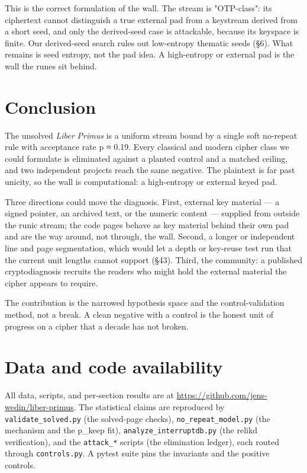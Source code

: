 \documentclass[11pt]{article}
\begin{document}
This is the correct formulation of the wall. The stream is "OTP-class": its ciphertext cannot distinguish a true external pad from a keystream derived from a short seed, and only the derived-seed case is attackable, because its keyspace is finite. Our derived-seed search rules out low-entropy thematic seeds (§6). What remains is seed entropy, not the pad idea. A high-entropy or external pad is the wall the runes sit behind.


\section{Conclusion}

The unsolved \emph{Liber Primus} is a uniform stream bound by a single soft no-repeat rule with acceptance rate p ≈ 0.19. Every classical and modern cipher class we could formulate is eliminated against a planted control and a matched ceiling, and two independent projects reach the same negative. The plaintext is far past unicity, so the wall is computational: a high-entropy or external keyed pad.


Three directions could move the diagnosis. First, external key material — a signed pointer, an archived text, or the numeric content — supplied from outside the runic stream; the code pages behave as key material behind their own pad and are the way around, not through, the wall. Second, a longer or independent line and page segmentation, which would let a depth or key-reuse test run that the current unit lengths cannot support (§43). Third, the community: a published cryptodiagnosis recruits the readers who might hold the external material the cipher appears to require.


The contribution is the narrowed hypothesis space and the control-validation method, not a break. A clean negative with a control is the honest unit of progress on a cipher that a decade has not broken.



\section{Data and code availability}

All data, scripts, and per-section results are at \url{https://github.com/jens-wedin/liber-primus}. The statistical claims are reproduced by \texttt{validate\_solved.py} (the solved-page checks), \texttt{no\_repeat\_model.py} (the mechanism and the p\_keep fit), \texttt{analyze\_interruptdb.py} (the relikd verification), and the \texttt{attack\_*} scripts (the elimination ledger), each routed through \texttt{controls.py}. A pytest suite pins the invariants and the positive controls.
\end{document}
